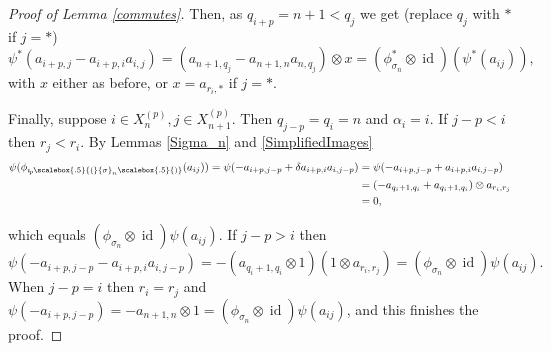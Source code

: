 \documentclass[11pt]{amsart}
\def\s{{\sigma}}
\def\a{\alpha}
\newcommand*{\subsmallp}[1]{\scalebox{.5}{\ensuremath#1}}
\newcommand{\subpp}[2][p]{\imath_{\hspace*{-1pt}#1}\hspace*{-.5pt}\subsmallp(#2\subsmallp)}
\newcommand\id{\operatorname{id}}
\theoremstyle{definition}
\begin{document}
\begin{proof} [Proof of Lemma \ref{commutes}]
\noindent Then, as $q_{i+p} = n+1<q_j$ we get (replace $q_j$ with $\ast$ if $j=\ast$)
$$\psi^\ast(a_{i+p,j} - a_{i+p,i}a_{i,j}) = (a_{n+1,q_j} - a_{n+1,n}a_{n,q_j})\otimes x = (\phi^\ast_{\s_n} \otimes \id)(\psi^\ast(a_{ij})),$$
\noindent with $x$ either as before, or $x=a_{r_i,\ast}$ if $j=\ast$.

Finally, suppose $i\in X_n^{(p)},j\in X_{n+1}^{(p)}$. Then $q_{j-p}=q_i=n$ and $\a_i=i$. If $j-p<i$ then $r_j<r_i$. By Lemmas \ref{Sigma_n} and \ref{SimplifiedImages}
\begin{align*}
  \psi(\phi_{\subpp{\s_n}}(a_{ij})) = \psi(-a_{i+p,j-p}+\delta a_{i+p,i}a_{i,j-p})
            &= \psi(-a_{i+p,j-p}+a_{i+p,i}a_{i,j-p})\\
            &= (-a_{q_i+1,q_i}+a_{q_i+1,q_i})\otimes a_{r_i,r_j}\\
            &=0,
\end{align*}

\noindent which equals $(\phi_{\s_n}\otimes\id)\psi(a_{ij})$. If $j-p>i$ then 
  \[\psi(-a_{i+p,j-p}-a_{i+p,i}a_{i,j-p}) = -(a_{q_i+1,q_i}\otimes 1)(1\otimes a_{r_i,r_j}) = (\phi_{\s_n}\otimes\id)\psi(a_{ij}).\]
\noindent When $j-p=i$ then $r_i=r_j$ and $\psi(-a_{i+p,j-p}) = -a_{n+1,n}\otimes 1=(\phi_{\s_n}\otimes\id)\psi(a_{ij})$, and this finishes the proof.
\end{proof}



\end{document}
